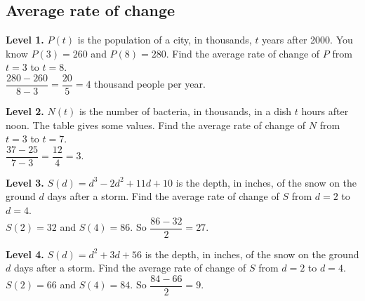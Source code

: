 \documentclass[11pt]{article}
\begin{document}
\subsection*{Average rate of change}
\noindent\textbf{Level 1.} $P(t)$ is the population of a city, in thousands, $t$ years after 2000. You know $P(3)=260$ and $P(8)=280$. Find the average rate of change of $P$ from $t=3$ to $t=8$.\\  \quad $\dfrac{280-260}{8-3}=\dfrac{20}{5}=4$ thousand people per year.\par\medskip
\noindent\textbf{Level 2.} $N(t)$ is the number of bacteria, in thousands, in a dish $t$ hours after noon. The table gives some values. Find the average rate of change of $N$ from $t=3$ to $t=7$.\\  \quad $\dfrac{37-25}{7-3}=\dfrac{12}{4}=3$.\par\medskip
\noindent\textbf{Level 3.} $S(d)=d^{3}-2d^{2}+11d+10$ is the depth, in inches, of the snow on the ground $d$ days after a storm. Find the average rate of change of $S$ from $d=2$ to $d=4$.\\  \quad $S(2)=32$ and $S(4)=86$. So $\dfrac{86-32}{2}=27$.\par\medskip
\noindent\textbf{Level 4.} $S(d)=d^{2}+3d+56$ is the depth, in inches, of the snow on the ground $d$ days after a storm. Find the average rate of change of $S$ from $d=2$ to $d=4$.\\  \quad $S(2)=66$ and $S(4)=84$. So $\dfrac{84-66}{2}=9$.\par\medskip
\end{document}
